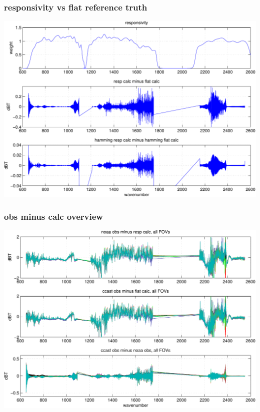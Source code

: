 \documentclass[11pt]{beamer}
\begin{document}
\begin{frame}
\frametitle{responsivity vs flat reference truth}
\begin{center}
  \includegraphics[scale=0.5]{figures/resp_flat_diff.pdf}
\end{center}
\end{frame}
\begin{frame}
\frametitle{obs minus calc overview}
\begin{center}
  \includegraphics[scale=0.5]{figures/cal_summary.pdf}
\end{center}
\end{frame}
\end{document}
